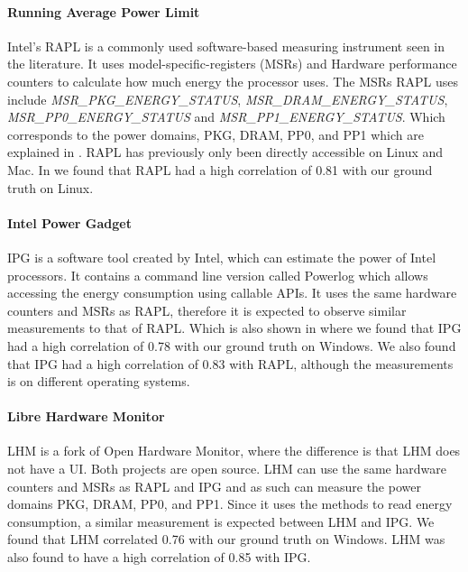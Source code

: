 \paragraph{Running Average Power Limit}
Intel's RAPL is a commonly used software-based measuring instrument seen in the literature.\cite{biksbois} It uses model-specific-registers (MSRs) and Hardware performance counters to calculate how much energy the processor uses. The MSRs RAPL uses include \textit{MSR\_PKG\_ENERGY\_STATUS}, \textit{MSR\_DRAM\_ENERGY\_STATUS}, \textit{MSR\_PP0\_ENERGY\_STATUS} and \textit{MSR\_PP1\_ENERGY\_STATUS}. Which corresponds to the power domains, PKG, DRAM, PP0, and PP1 which are explained in \cite{biksbois}. RAPL has previously only been directly accessible on Linux and Mac. In \cite{biksbois} we found that RAPL had a high correlation of 0.81 with our ground truth on Linux.\cite{biksbois}

\paragraph{Intel Power Gadget}
IPG is a software tool created by Intel, which can estimate the power of Intel processors. It contains a command line version called Powerlog which allows accessing the energy consumption using callable APIs. It uses the same hardware counters and MSRs as RAPL\cite{FireFox}, therefore it is expected to observe similar measurements to that of RAPL. Which is also shown in \cite{biksbois} where we found that IPG had a high correlation of 0.78 with our ground truth on Windows. We also found that IPG had a high correlation of 0.83 with RAPL, although the measurements is on different operating systems.\cite{biksbois}





\paragraph{Libre Hardware Monitor}
LHM\cite{LHM} is a fork of Open Hardware Monitor, where the difference is that LHM does not have a UI. Both projects are open source. LHM can use the same hardware counters and MSRs as RAPL and IPG and as such can measure the power domains PKG, DRAM, PP0, and PP1. Since it uses the methods to read energy consumption, a similar measurement is expected between LHM and IPG. We found that LHM correlated 0.76 with our ground truth on Windows. LHM was also found to have a high correlation of 0.85 with IPG.\cite{biksbois}

